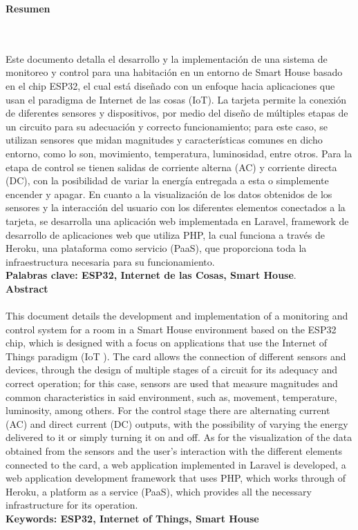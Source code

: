 \newpage
\thispagestyle{empty} \textbf{}\normalsize
\textbf{\LARGE Resumen}
\markboth{}{}
\\\\
 Este documento detalla el desarrollo y la implementación de una sistema de monitoreo y control para una habitación en un entorno de Smart House basado en el chip ESP32, el cual está diseñado con un enfoque hacia aplicaciones que usan el paradigma de Internet de las cosas (IoT). La tarjeta permite la conexión de diferentes sensores y dispositivos, por medio del diseño de múltiples etapas de un circuito para su adecuación y correcto funcionamiento; para este caso, se utilizan sensores que midan magnitudes y características comunes en dicho entorno, como lo son, movimiento, temperatura, luminosidad, entre otros. Para la etapa de control se tienen salidas de corriente alterna (AC) y corriente directa (DC), con la posibilidad de variar la energía entregada a esta o simplemente encender y apagar. En cuanto a la visualización de los datos obtenidos de los sensores y la interacción del usuario con los diferentes elementos conectados a la tarjeta, se desarrolla una aplicación web implementada en Laravel, framework de desarrollo de aplicaciones web que utiliza PHP, la cual funciona a través de Heroku, una plataforma como servicio (PaaS), que proporciona toda la infraestructura necesaria para su funcionamiento.\\
\textbf{\small Palabras clave: ESP32, Internet de las Cosas, Smart House}.\\[1.0cm]
\textbf{\LARGE Abstract}\\\\
This document details the development and implementation of a monitoring and control system for a room in a Smart House environment based on the ESP32 chip, which is designed with a focus on applications that use the Internet of Things paradigm (IoT ). The card allows the connection of different sensors and devices, through the design of multiple stages of a circuit for its adequacy and correct operation; for this case, sensors are used that measure magnitudes and common characteristics in said environment, such as, movement, temperature, luminosity, among others. For the control stage there are alternating current (AC) and direct current (DC) outputs, with the possibility of varying the energy delivered to it or simply turning it on and off. As for the visualization of the data obtained from the sensors and the user's interaction with the different elements connected to the card, a web application implemented in Laravel is developed, a web application development framework that uses PHP, which works through of Heroku, a platform as a service (PaaS), which provides all the necessary infrastructure for its operation.\\[1.0cm]
\textbf{\small Keywords: ESP32, Internet of Things, Smart House}
